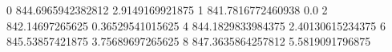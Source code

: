 0 844.6965942382812 2.9149169921875
1 841.7816772460938 0.0
2 842.14697265625 0.36529541015625
4 844.1829833984375 2.40130615234375
6 845.53857421875 3.75689697265625
8 847.3635864257812 5.5819091796875
